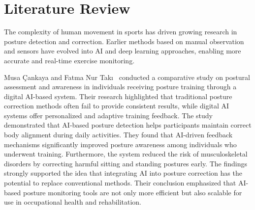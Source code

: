 \chapter{Literature Review}
\label{C2} %
\graphicspath{{Figures/Chapter-2figs/PDF/}{Figures/Chapter-2figs/}}

The complexity of human movement in sports has driven growing research in posture detection 
	and correction. Earlier methods based on manual observation and sensors have evolved into AI 
	and deep learning approaches, enabling more accurate and real-time exercise monitoring.

Musa Çankaya and Fatma Nur Takı~\cite{cankaya2024posture} conducted a comparative study on postural assessment and awareness in individuals receiving posture training through a digital AI-based system. 
Their research highlighted that traditional posture correction methods often fail to provide 
consistent results, while digital AI systems offer personalized and adaptive training feedback. 
The study demonstrated that AI-based posture detection helps participants maintain correct 
body alignment during daily activities. They found that AI-driven feedback mechanisms 
significantly improved posture awareness among individuals who underwent training. 
Furthermore, the system reduced the risk of musculoskeletal disorders by correcting harmful 
sitting and standing postures early. The findings strongly supported the idea that integrating AI 
into posture correction has the potential to replace conventional methods. Their conclusion 
emphasized that AI- based posture monitoring tools are not only more efficient but also 
scalable for use in occupational health and rehabilitation. 

